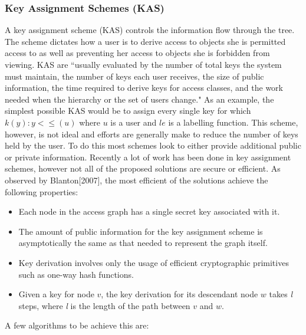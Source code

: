 \documentclass[12pt, titlepage]{article}
\begin{document}
\subsubsection{Key Assignment Schemes (KAS)}
A key assignment scheme (KAS) controls the information flow through the tree. The scheme dictates how a user is to derive access to objects she is permitted access to as well as preventing her access to objects she is forbidden from viewing. KAS are ``usually evaluated by the number of total keys the system must maintain, the number of keys each user receives, the size of public information, the time required to derive keys for access classes, and the work needed when the hierarchy or the set of users change.\cite{atallah2005}" As an example, the simplest possible KAS would be to assign every single key for which $k(y) : y<\le(u)$ where $u$ is a user and $le$ is a labelling function. This scheme, however, is not ideal and efforts are generally make to reduce the number of keys held by the user. To do this most schemes look to either provide additional public or private information. 
\newline \indent Recently a lot of work has been done in key assignment schemes, however not all of the proposed solutions are secure or efficient. As observed by Blanton[2007], the most efficient of the solutions achieve the following properties\cite{blanton2007}:
\begin{itemize}
\item Each node in the access graph has a single secret key associated with it.
\item The amount of public information for the key assignment scheme is asymptotically the same as that needed to represent the graph itself.
\item Key derivation involves only the usage of efficient cryptographic primitives such
as one-way hash functions.
\item Given a key for node $v$, the key derivation for its descendant node $w$ takes \textit{l} steps, where \textit{l} is the length of the path between $v$ and $w$.
\end{itemize}
 A few algorithms to be achieve this are:
\end{document}
